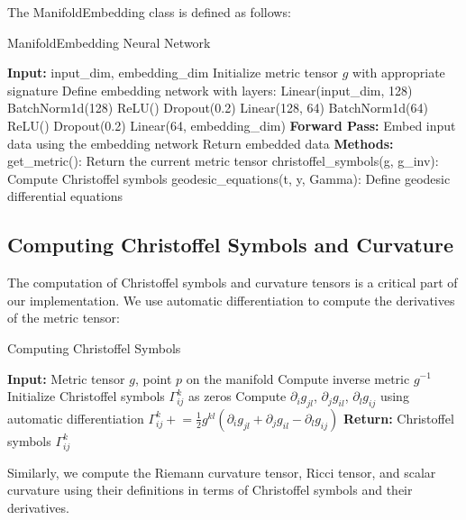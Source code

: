 \documentclass[11pt,a4paper]{article}
\begin{document}
The ManifoldEmbedding class is defined as follows:

\begin{algorithm}
\caption{ManifoldEmbedding Neural Network}
\begin{algorithmic}[1]
\State \textbf{Input:} input\_dim, embedding\_dim
\State Initialize metric tensor $g$ with appropriate signature
\State Define embedding network with layers:
\State \quad Linear(input\_dim, 128)
\State \quad BatchNorm1d(128)
\State \quad ReLU()
\State \quad Dropout(0.2)
\State \quad Linear(128, 64)
\State \quad BatchNorm1d(64)
\State \quad ReLU()
\State \quad Dropout(0.2)
\State \quad Linear(64, embedding\_dim)
\State \textbf{Forward Pass:}
\State \quad Embed input data using the embedding network
\State \quad Return embedded data
\State \textbf{Methods:}
\State \quad get\_metric(): Return the current metric tensor
\State \quad christoffel\_symbols(g, g\_inv): Compute Christoffel symbols
\State \quad geodesic\_equations(t, y, Gamma): Define geodesic differential equations
\end{algorithmic}
\end{algorithm}

\subsection{Computing Christoffel Symbols and Curvature}

The computation of Christoffel symbols and curvature tensors is a critical part of our implementation. We use automatic differentiation to compute the derivatives of the metric tensor:

\begin{algorithm}
\caption{Computing Christoffel Symbols}
\begin{algorithmic}[1]
\State \textbf{Input:} Metric tensor $g$, point $p$ on the manifold
\State Compute inverse metric $g^{-1}$
\State Initialize Christoffel symbols $\Gamma^k_{ij}$ as zeros
        \State Compute $\partial_i g_{jl}$, $\partial_j g_{il}$, $\partial_l g_{ij}$ using automatic differentiation
        \State $\Gamma^k_{ij} \mathrel{+}= \frac{1}{2} g^{kl} (\partial_i g_{jl} + \partial_j g_{il} - \partial_l g_{ij})$
    \EndFor
\EndFor
\State \textbf{Return:} Christoffel symbols $\Gamma^k_{ij}$
\end{algorithmic}
\end{algorithm}

Similarly, we compute the Riemann curvature tensor, Ricci tensor, and scalar curvature using their definitions in terms of Christoffel symbols and their derivatives.
\end{document}
